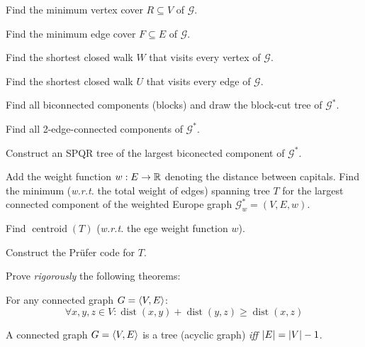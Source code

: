 \documentclass[a4paper,12pt]{article}
\newcommand{\graph}[1][G]{\mathcal{#1}}
\newcommand{\op}[1]{\operatorname*{#1}}
\newcommand{\graphCentroid}[1]{\op{centroid}(#1)}
\newcommand{\dist}[1]{\op{dist}(#1)}
\begin{document}
\begin{tasks}
\begin{subtasks}
        \item Find the minimum vertex cover $R \subseteq V$ of $\graph$.
        
        \item Find the minimum edge cover $F \subseteq E$ of $\graph$.
        
        \item Find the shortest closed walk $W$ that visits every vertex of $\graph$.
        
        \item Find the shortest closed walk $U$ that visits every edge of $\graph$.
        
        \item Find all biconnected components (blocks) and draw the block-cut tree of $\graph^{*}$.
        
        \item Find all 2-edge-connected components of $\graph^{*}$.
        
        \item Construct an SPQR tree of the largest biconected component of $\graph^{*}$.
        
        \item Add the weight function $w: E \to \mathbb{R}$ denoting the distance between capitals. Find the minimum (\textit{w.r.t.} the total weight of edges) spanning tree $T$ for the largest connected component of the weighted Europe graph $\graph^{*}_{w} = (V, E, w)$.
        
        \item Find $\graphCentroid{T}$ (\textit{w.r.t.} the ege weight function $w$).
        
        \item Construct the Prüfer code for $T$.
    \end{subtasks}

    \item Prove \emph{rigorously} the following theorems:
    
    \begin{theorem}
        For any connected graph $G = \langle V, E\rangle$:
        $$\forall x, y, z \in V: \dist{x, y} + \dist{y, z} \geq \dist{x, z}$$
    \end{theorem}

    \begin{theorem}[Tree]
        A connected graph $G = \langle V, E\rangle$ is a tree (\ie acyclic graph) \emph{iff} $\left|E\right| = \left|V\right| - 1$.
    \end{theorem}


\end{tasks}
\end{document}
